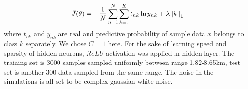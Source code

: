 \begin{equation}
{\kern 1pt} {\kern 1pt} {\kern 1pt} {\kern 1pt} {\kern 1pt} {\kern 1pt} \tilde J(\theta ){\kern 1pt} {\kern 1pt} {\kern 1pt} {\rm{ = }}{\kern 1pt} {\kern 1pt} {\kern 1pt} {\rm{ - }}{{\rm{1}} \over N}\sum\limits_{n = 1}^N {\sum\limits_{k = 1}^K {{t_{nk}}\ln {y_{nk}}{\kern 1pt} {\kern 1pt} {\kern 1pt} {\rm{ + }}{\kern 1pt} {\kern 1pt} \lambda {{\left\| h \right\|}_1}} }
\end{equation}
where $t_{nk}$ and $y_{nk}$ are real and predictive probability of sample data $x$ belongs to class $k$ separately. We chose $C=1$ here.
For the sake of learning speed and sparsity of hidden neurons, $ReLU$ activation was applied in hidden layer.
The training set is 3000 samples sampled uniformly between range 1.82\--8.65km, test set is another 300 data sampled from the same range. The noise in the simulations is all set to be complex gaussian white noise.

